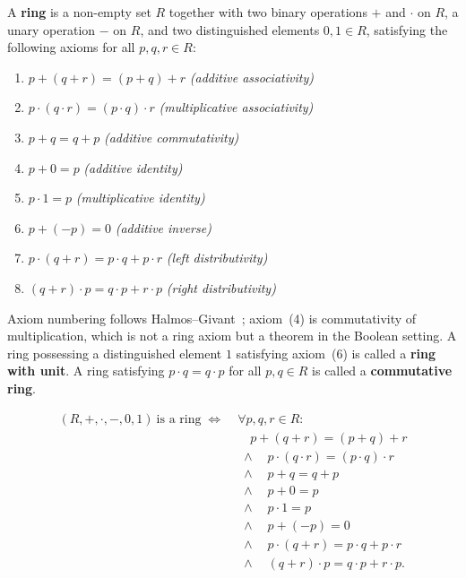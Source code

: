 \begin{tcolorbox}[colback=defbox, colframe=defborder, arc=2pt,
  left=6pt, right=6pt, top=4pt, bottom=4pt,
  title={\small\textbf{Definition --- Ring}},
  fonttitle=\small\bfseries]
\begin{definition}[Ring]
\label{def:ring}
A \textbf{ring} is a non-empty set $R$ together with two binary
operations $+$ and $\cdot$ on $R$, a unary operation $-$ on $R$,
and two distinguished elements $0, 1 \in R$, satisfying the
following axioms for all $p, q, r \in R$:
\begin{enumerate}
  \item[(1)] $p + (q + r) = (p + q) + r$
             \hfill\textit{(additive associativity)}
  \item[(2)] $p \cdot (q \cdot r) = (p \cdot q) \cdot r$
             \hfill\textit{(multiplicative associativity)}
  \item[(3)] $p + q = q + p$
             \hfill\textit{(additive commutativity)}
  \item[(5)] $p + 0 = p$
             \hfill\textit{(additive identity)}
  \item[(6)] $p \cdot 1 = p$
             \hfill\textit{(multiplicative identity)}
  \item[(7)] $p + (-p) = 0$
             \hfill\textit{(additive inverse)}
  \item[(8)] $p \cdot (q + r) = p \cdot q + p \cdot r$
             \hfill\textit{(left distributivity)}
  \item[(9)] $(q + r) \cdot p = q \cdot p + r \cdot p$
             \hfill\textit{(right distributivity)}
\end{enumerate}
Axiom numbering follows Halmos--Givant~\cite{HalmosGivant2009};
axiom~(4) is commutativity of multiplication, which is not a ring
axiom but a theorem in the Boolean setting.
A ring possessing a distinguished element $1$ satisfying
axiom~(6) is called a \textbf{ring with unit}.
A ring satisfying $p \cdot q = q \cdot p$ for all $p, q \in R$
is called a \textbf{commutative ring}.
\end{definition}
\end{tcolorbox}

\begin{remark*}
\[
\begin{aligned}
(R,+,\cdot,-,0,1)\ \text{is a ring}
\;\Longleftrightarrow\;
  &\forall p,q,r \in R{:} \\
  &\quad p + (q + r) = (p + q) + r \\
  &\;\land\quad p \cdot (q \cdot r) = (p \cdot q) \cdot r \\
  &\;\land\quad p + q = q + p \\
  &\;\land\quad p + 0 = p \\
  &\;\land\quad p \cdot 1 = p \\
  &\;\land\quad p + (-p) = 0 \\
  &\;\land\quad p \cdot (q + r) = p \cdot q + p \cdot r \\
  &\;\land\quad (q + r) \cdot p = q \cdot p + r \cdot p.
\end{aligned}
\]
\end{remark*}

